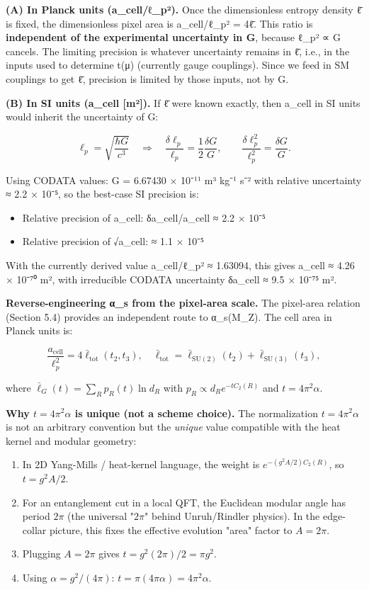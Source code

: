 \textbf{(A) In Planck units (a\_cell/ℓ\_p²).} Once the dimensionless entropy density \={ℓ} is fixed, the dimensionless pixel area is a\_cell/ℓ\_p² = 4\={ℓ}. This ratio is \textbf{independent of the experimental uncertainty in G}, because ℓ\_p² ∝ G cancels. The limiting precision is whatever uncertainty remains in \={ℓ}, i.e., in the inputs used to determine t(μ) (currently gauge couplings). Since we feed in SM couplings to get \={ℓ}, precision is limited by those inputs, not by G.

\textbf{(B) In SI units (a\_cell {[}m²{]}).} If \={ℓ} were known exactly, then a\_cell in SI units would inherit the uncertainty of G:

\[
\ell_p = \sqrt{\frac{\hbar G}{c^3}} \quad \Rightarrow \quad
\frac{\delta \ell_p}{\ell_p} = \frac{1}{2}\frac{\delta G}{G}, \qquad
\frac{\delta \ell_p^2}{\ell_p^2} = \frac{\delta G}{G}.
\]

Using CODATA values: G = 6.67430 × 10⁻¹¹ m³ kg⁻¹ s⁻² with relative uncertainty ≈ 2.2 × 10⁻⁵, so the best-case SI precision is:

\begin{itemize}
\tightlist
\item
  Relative precision of a\_cell: δa\_cell/a\_cell ≈ 2.2 × 10⁻⁵
\item
  Relative precision of √a\_cell: ≈ 1.1 × 10⁻⁵
\end{itemize}

With the currently derived value a\_cell/ℓ\_p² ≈ 1.63094, this gives a\_cell ≈ 4.26 × 10⁻⁷⁰ m², with irreducible CODATA uncertainty δa\_cell ≈ 9.5 × 10⁻⁷⁵ m².

\textbf{Reverse-engineering α\_s from the pixel-area scale.} The pixel-area relation (Section 5.4) provides an independent route to α\_s(M\_Z). The cell area in Planck units is:

\[
\frac{a_{\mathrm{cell}}}{\ell_p^2} = 4 \bar{\ell}_{\mathrm{tot}}(t_2, t_3),
\quad
\bar{\ell}_{\mathrm{tot}} = \bar{\ell}_{\mathrm{SU}(2)}(t_2) + \bar{\ell}_{\mathrm{SU}(3)}(t_3),
\]

where \(\bar{\ell}_G(t) = \sum_R p_R(t) \ln d_R\) with \(p_R \propto d_R e^{-t C_2(R)}\) and \(t = 4\pi^2 \alpha\).

\textbf{Why \(t = 4\pi^2 \alpha\) is unique (not a scheme choice).} The normalization \(t = 4\pi^2 \alpha\) is not an arbitrary convention but the \emph{unique} value compatible with the heat kernel and modular geometry:

\begin{enumerate}
\def\labelenumi{\arabic{enumi}.}
\item
  In 2D Yang-Mills / heat-kernel language, the weight is \(e^{-(g^2 A/2) C_2(R)}\), so \(t = g^2 A / 2\).
\item
  For an entanglement cut in a local QFT, the Euclidean modular angle has period \(2\pi\) (the universal "\(2\pi\)" behind Unruh/Rindler physics). In the edge-collar picture, this fixes the effective evolution "area" factor to \(A = 2\pi\).
\item
  Plugging \(A = 2\pi\) gives \(t = g^2 (2\pi)/2 = \pi g^2\).
\item
  Using \(\alpha = g^2/(4\pi)\): \(t = \pi (4\pi \alpha) = 4\pi^2 \alpha\).
\end{enumerate}

